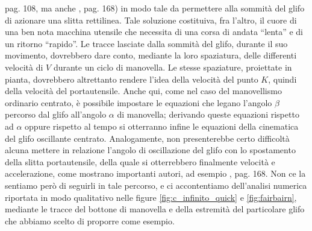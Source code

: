 pag. 108, ma anche \cite{hartog}, pag. 168) in modo tale da permettere alla
sommit\`a
del glifo di azionare una slitta rettilinea. Tale soluzione costituiva,
fra l'altro,
il cuore di una ben nota macchina utensile che necessita di una corsa di andata
``lenta'' e di un ritorno ``rapido''.
Le tracce lasciate dalla sommit\`a del glifo, durante il suo movimento, dovrebbero dare
conto, mediante la loro spaziatura, delle differenti velocit\`a di $V$ durante
un ciclo di manovella. Le stesse spaziature, proiettate in pianta, dovrebbero
altrettanto rendere l'idea della velocit\`a del punto $K$, quindi della velocit\`a
del portautensile.
Anche qui, come nel caso del manovellismo ordinario centrato, \`e possibile
impostare le equazioni che legano l'angolo $\beta$ percorso dal glifo
all'angolo $\alpha$ di manovella;
derivando queste equazioni
rispetto ad $\alpha$ oppure rispetto al tempo si otterranno infine
le equazioni della cinematica del glifo oscillante centrato. Analogamente,
non presenterebbe certo difficolt\`a alcuna mettere
 in relazione l'angolo di oscillazione del glifo con lo spostamento
della slitta portautensile, della quale si otterrebbero finalmente
 velocit\`a e accelerazione, come mostrano
importanti autori, ad esempio \cite{hartog}, pag. 168.
Non ce la sentiamo per\`o di seguirli in tale percorso,
e ci accontentiamo dell'analisi numerica
riportata in modo qualitativo nelle figure
 \ref{fig:c_infinito_quick} e
 \ref{fig:fairbairn}, mediante le tracce del bottone di manovella
 e della estremit\`a del particolare glifo che abbiamo scelto di
proporre come esempio.

